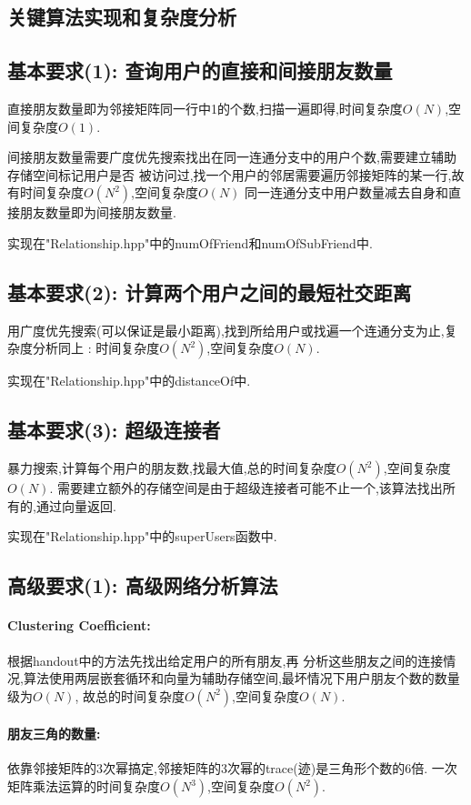 \documentclass{article}
\begin{document}
\begin{CJK*}{UTF8}{gbsn}
\section{关键算法实现和复杂度分析}
\subsection{基本要求(1): 查询用户的直接和间接朋友数量}
\par 直接朋友数量即为邻接矩阵同一行中1的个数,扫描一遍即得,时间复杂度$O(N)$,空间复杂度$O(1)$.
\par 间接朋友数量需要广度优先搜索找出在同一连通分支中的用户个数,需要建立辅助存储空间标记用户是否
被访问过,找一个用户的邻居需要遍历邻接矩阵的某一行,故有时间复杂度$O(N^2)$,空间复杂度$O(N)$
同一连通分支中用户数量减去自身和直接朋友数量即为间接朋友数量.
\par 实现在"Relationship.hpp"中的numOfFriend和numOfSubFriend中.
\subsection{基本要求(2): 计算两个用户之间的最短社交距离}
\par 用广度优先搜索(可以保证是最小距离),找到所给用户或找遍一个连通分支为止,复杂度分析同上
: 时间复杂度$O(N^2)$,空间复杂度$O(N)$.
\par 实现在"Relationship.hpp"中的distanceOf中.
\subsection{基本要求(3): 超级连接者}
\par 暴力搜索,计算每个用户的朋友数,找最大值,总的时间复杂度$O(N^2)$,空间复杂度$O(N)$.
需要建立额外的存储空间是由于超级连接者可能不止一个,该算法找出所有的,通过向量返回.
\par 实现在"Relationship.hpp"中的superUsers函数中.
\subsection{高级要求(1): 高级网络分析算法}
\paragraph{Clustering Coefficient: } 根据handout中的方法先找出给定用户的所有朋友,再
分析这些朋友之间的连接情况,算法使用两层嵌套循环和向量为辅助存储空间,最坏情况下用户朋友个数的数量级为$O(N)$,
故总的时间复杂度$O(N^2)$,空间复杂度$O(N)$.
\paragraph{朋友三角的数量: }依靠邻接矩阵的3次幂搞定,邻接矩阵的3次幂的trace(迹)是三角形个数的6倍.
一次矩阵乘法运算的时间复杂度$O(N^3)$,空间复杂度$O(N^2)$.

\end{CJK*}
\end{document}

